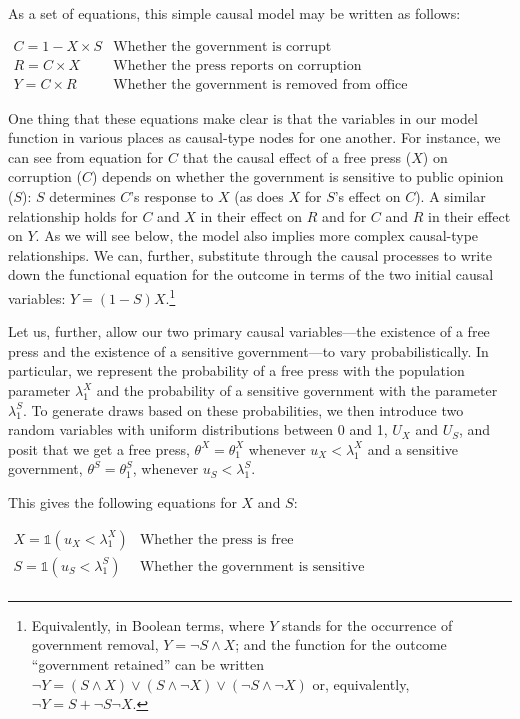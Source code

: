 \documentclass[12pt,]{book}
\let\rmarkdownfootnote\footnote%
\def\footnote{\protect\rmarkdownfootnote}
\begin{document}
As a set of equations, this simple causal model may be written as follows:

\(\begin{array}{ll} C = 1-X\times S & \mbox{Whether the government is corrupt}\\ R = C\times X & \mbox{Whether the press reports on corruption}\\ Y = C\times R & \mbox{Whether the government is removed from office} \end{array}\)

One thing that these equations make clear is that the variables in our model function in various places as causal-type nodes for one another. For instance, we can see from equation for \(C\) that the causal effect of a free press (\(X\)) on corruption (\(C\)) depends on whether the government is sensitive to public opinion (\(S\)): \(S\) determines \(C\)'s response to \(X\) (as does \(X\) for \(S\)'s effect on \(C\)). A similar relationship holds for \(C\) and \(X\) in their effect on \(R\) and for \(C\) and \(R\) in their effect on \(Y\). As we will see below, the model also implies more complex causal-type relationships. We can, further, substitute through the causal processes to write down the functional equation for the outcome in terms of the two initial causal variables: \(Y=(1-S)X\).\footnote{Equivalently, in Boolean terms, where \(Y\) stands for the occurrence of government removal, \(Y= \neg S \land X\); and the function for the outcome ``government retained'' can be written \(\neg Y = (S\land X) \lor (S\land\neg X) \lor (\neg S \land \neg X)\) or, equivalently, \(\neg Y = S + \neg S \neg X\).}

Let us, further, allow our two primary causal variables---the existence of a free press and the existence of a sensitive government---to vary probabilistically. In particular, we represent the probability of a free press with the population parameter \(\lambda^X_1\) and the probability of a sensitive government with the parameter \(\lambda^S_1\). To generate draws based on these probabilities, we then introduce two random variables with uniform distributions between 0 and 1, \(U_X\) and \(U_S\), and posit that we get a free press, \(\theta^X=\theta^X_1\) whenever \(u_X < \lambda^X_1\) and a sensitive government, \(\theta^S=\theta^S_1\), whenever \(u_S < \lambda_1^S\).

This gives the following equations for \(X\) and \(S\):

\(\begin{array}{ll} X = \mathbb{1}(u_X < \lambda^X_1) & \mbox{Whether the press is free}\\ S = \mathbb{1}(u_S < \lambda^S_1) & \mbox{Whether the government is sensitive}\\ \end{array}\)
\end{document}
